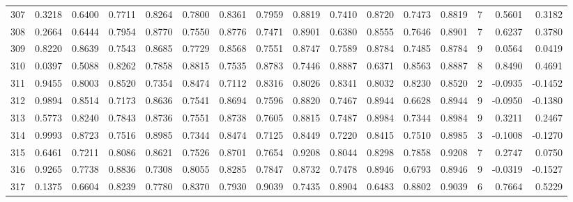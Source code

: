 \begin{tabular}{lrrrrrrrrrrrrrrr}
307 &      0.3218 &  0.6400 &  0.7711 &  0.8264 &  0.7800 &  0.8361 &  0.7959 &  0.8819 &  0.7410 &  0.8720 &   0.7473 &     0.8819 &      7 &                    0.5601 &                     0.3182 \\
308 &      0.2664 &  0.6444 &  0.7954 &  0.8770 &  0.7550 &  0.8776 &  0.7471 &  0.8901 &  0.6380 &  0.8555 &   0.7646 &     0.8901 &      7 &                    0.6237 &                     0.3780 \\
309 &      0.8220 &  0.8639 &  0.7543 &  0.8685 &  0.7729 &  0.8568 &  0.7551 &  0.8747 &  0.7589 &  0.8784 &   0.7485 &     0.8784 &      9 &                    0.0564 &                     0.0419 \\
310 &      0.0397 &  0.5088 &  0.8262 &  0.7858 &  0.8815 &  0.7535 &  0.8783 &  0.7446 &  0.8887 &  0.6371 &   0.8563 &     0.8887 &      8 &                    0.8490 &                     0.4691 \\
311 &      0.9455 &  0.8003 &  0.8520 &  0.7354 &  0.8474 &  0.7112 &  0.8316 &  0.8026 &  0.8341 &  0.8032 &   0.8230 &     0.8520 &      2 &                   -0.0935 &                    -0.1452 \\
312 &      0.9894 &  0.8514 &  0.7173 &  0.8636 &  0.7541 &  0.8694 &  0.7596 &  0.8820 &  0.7467 &  0.8944 &   0.6628 &     0.8944 &      9 &                   -0.0950 &                    -0.1380 \\
313 &      0.5773 &  0.8240 &  0.7843 &  0.8736 &  0.7551 &  0.8738 &  0.7605 &  0.8815 &  0.7487 &  0.8984 &   0.7344 &     0.8984 &      9 &                    0.3211 &                     0.2467 \\
314 &      0.9993 &  0.8723 &  0.7516 &  0.8985 &  0.7344 &  0.8474 &  0.7125 &  0.8449 &  0.7220 &  0.8415 &   0.7510 &     0.8985 &      3 &                   -0.1008 &                    -0.1270 \\
315 &      0.6461 &  0.7211 &  0.8086 &  0.8621 &  0.7526 &  0.8701 &  0.7654 &  0.9208 &  0.8044 &  0.8298 &   0.7858 &     0.9208 &      7 &                    0.2747 &                     0.0750 \\
316 &      0.9265 &  0.7738 &  0.8836 &  0.7308 &  0.8055 &  0.8285 &  0.7847 &  0.8732 &  0.7478 &  0.8946 &   0.6793 &     0.8946 &      9 &                   -0.0319 &                    -0.1527 \\
317 &      0.1375 &  0.6604 &  0.8239 &  0.7780 &  0.8370 &  0.7930 &  0.9039 &  0.7435 &  0.8904 &  0.6483 &   0.8802 &     0.9039 &      6 &                    0.7664 &                     0.5229 \\

\end{tabular}
